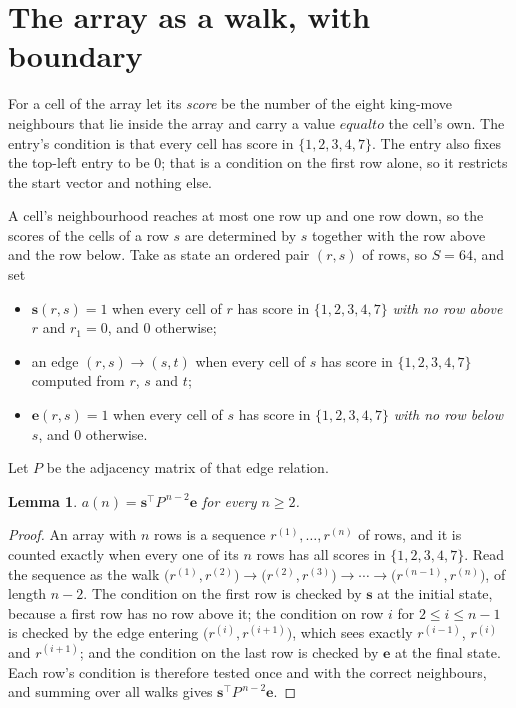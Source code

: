 \documentclass[11pt,a4paper]{article}
\theoremstyle{plain}
\newtheorem{lemma}[theorem]{Lemma}
\theoremstyle{definition}
\begin{document}
\section{The array as a walk, with boundary}

For a cell of the array let its \emph{score} be the number of the eight king-move neighbours that lie inside
the array and carry a value $equal to$ the cell's own. The entry's condition is that every cell
has score in $\{1,2,3,4,7\}$. The entry also fixes the top-left entry to be $0$; that is a condition on the first row alone, so it restricts the start vector and nothing else.

A cell's neighbourhood reaches at most one row up and one row down, so the scores of the
cells of a row $s$ are determined by $s$ together with the row above and the row below.
Take as state an ordered pair $(r,s)$ of rows, so $S=64$, and set
\begin{itemize}
\item $\mathbf{s}(r,s)=1$ when every cell of $r$ has score in $\{1,2,3,4,7\}$ \emph{with no row
above $r$} and $r_1=0$, and $0$ otherwise;
\item an edge $(r,s)\to(s,t)$ when every cell of $s$ has score in $\{1,2,3,4,7\}$ computed from
$r$, $s$ and $t$;
\item $\mathbf{e}(r,s)=1$ when every cell of $s$ has score in $\{1,2,3,4,7\}$ \emph{with no row
below $s$}, and $0$ otherwise.
\end{itemize}
Let $P$ be the adjacency matrix of that edge relation.

\begin{lemma}\label{lem:walk}
$a(n)=\mathbf{s}^{\!\top}P^{\,n-2}\mathbf{e}$ for every $n\ge2$.
\end{lemma}

\begin{proof}
An array with $n$ rows is a sequence $r^{(1)},\dots,r^{(n)}$ of rows, and it is counted
exactly when every one of its $n$ rows has all scores in $\{1,2,3,4,7\}$. Read the sequence as the
walk $\bigl(r^{(1)},r^{(2)}\bigr)\to\bigl(r^{(2)},r^{(3)}\bigr)\to\cdots\to
\bigl(r^{(n-1)},r^{(n)}\bigr)$, of length $n-2$. The condition on the first row is
checked by $\mathbf{s}$ at the initial state, because a first row has no row above it; the
condition on row $i$ for $2\le i\le n-1$ is checked by the edge entering
$\bigl(r^{(i)},r^{(i+1)}\bigr)$, which sees exactly $r^{(i-1)}$, $r^{(i)}$ and
$r^{(i+1)}$; and the condition on the last row is checked by $\mathbf{e}$ at the final
state. Each row's condition is therefore tested once and with the correct neighbours, and
summing over all walks gives $\mathbf{s}^{\!\top}P^{\,n-2}\mathbf{e}$.
\end{proof}
\end{document}
